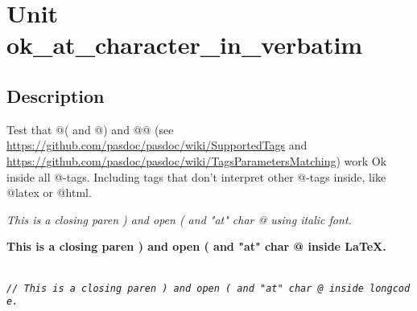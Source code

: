\documentclass{report}
\begin{document}
\label{toc}\tableofcontents
\newpage
\newlength{\tmplength}
\chapter{Unit ok{\_}at{\_}character{\_}in{\_}verbatim}
\label{ok_at_character_in_verbatim}
\section{Description}
Test that @( and @) and @@ (see \href{https://github.com/pasdoc/pasdoc/wiki/SupportedTags}{https://github.com/pasdoc/pasdoc/wiki/SupportedTags} and \href{https://github.com/pasdoc/pasdoc/wiki/TagsParametersMatching}{https://github.com/pasdoc/pasdoc/wiki/TagsParametersMatching}) work Ok inside all @{-}tags. Including tags that don't interpret other @{-}tags inside, like @latex or @html.

\textit{This is a closing paren ) and open ( and "at" char @ using italic font.}

{\bf This is a closing paren ) and open ( and "at" char @ inside LaTeX.}



\texttt{\\\nopagebreak[3]
\textit{//~This~is~a~closing~paren~)~and~open~(~and~"at"~char~@~inside~longcode.}\\
}
\end{document}
